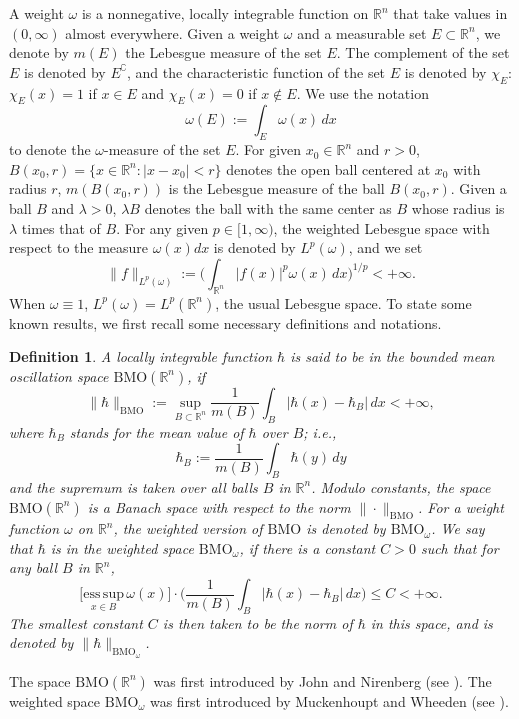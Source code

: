 \documentclass[preprint,10pt]{elsarticle}
\newtheorem{defin}[thm]{Definition}
\numberwithin{equation}{section}
\begin{document}
A weight $\omega$ is a nonnegative, locally integrable function on $\mathbb R^n$ that take values in $(0,\infty)$ almost everywhere. Given a weight $\omega$ and a measurable set $E\subset\mathbb R^n$, we denote by $m(E)$ the Lebesgue measure of the set $E$. The complement of the set $E$ is denoted by $E^{\complement}$, and the characteristic function of the set $E$ is denoted by $\chi_{E}$: $\chi_{E}(x)=1$ if $x\in E$ and $\chi_{E}(x)=0$ if $x\notin E$. We use the notation
\begin{equation*}
\omega(E):=\int_{E}\omega(x)\,dx
\end{equation*}
to denote the $\omega$-measure of the set $E$. For given $x_0\in\mathbb R^n$ and $r>0$, $B(x_0,r)=\{x\in\mathbb R^n:|x-x_0|<r\}$ denotes the open ball centered at $x_0$ with radius $r$, $m(B(x_0,r))$ is the Lebesgue measure of the ball $B(x_0,r)$. Given a ball $B$ and $\lambda>0$, $\lambda B$ denotes the ball with the same center as $B$ whose radius is $\lambda$ times that of $B$. For any given $p\in[1,\infty)$, the weighted Lebesgue space with respect to the measure $\omega(x)dx$ is denoted by $L^p(\omega)$, and we set
\begin{equation*}
\|f\|_{L^p(\omega)}:=\bigg(\int_{\mathbb R^n}|f(x)|^p\omega(x)\,dx\bigg)^{1/p}<+\infty.
\end{equation*}
When $\omega\equiv1$, $L^p(\omega)=L^p(\mathbb R^n)$, the usual Lebesgue space.
To state some known results, we first recall some necessary definitions and notations.
\begin{defin}
A locally integrable function $\hbar$ is said to be in the bounded mean oscillation space $\mathrm{BMO}(\mathbb R^n)$, if
\begin{equation*}
\|\hbar\|_{\mathrm{BMO}}:=\sup_{B\subset\mathbb R^n}\frac{1}{m(B)}\int_B|\hbar(x)-\hbar_B|\,dx<+\infty,
\end{equation*}
where $\hbar_B$ stands for the mean value of $\hbar$ over $B$; i.e.,
\begin{equation*}
\hbar_B:=\frac{1}{m(B)}\int_B \hbar(y)\,dy
\end{equation*}
and the supremum is taken over all balls $B$ in $\mathbb R^n$. Modulo constants, the space $\mathrm{BMO}(\mathbb R^n)$ is a Banach space with respect to the norm $\|\cdot\|_{\mathrm{BMO}}$.
For a weight function $\omega$ on $\mathbb R^n$, the weighted version of $\mathrm{BMO}$ is denoted by $\mathrm{BMO}_{\omega}$. We say that $\hbar$ is in the weighted space $\mathrm{BMO}_{\omega}$, if there is a constant $C>0$ such that for any ball $B$ in $\mathbb R^n$,
\begin{equation*}
\Big[\underset{x\in{B}}{\mathrm{ess\,sup}}\,\omega(x)\Big]\cdot
\bigg(\frac{1}{m(B)}\int_B|\hbar(x)-\hbar_B|\,dx\bigg)\leq C<+\infty.
\end{equation*}
The smallest constant $C$ is then taken to be the norm of $\hbar$ in this space, and is denoted by $\|\hbar\|_{\mathrm{BMO}_\omega}$.
\end{defin}
The space $\mathrm{BMO}(\mathbb R^n)$ was first introduced by John and Nirenberg (see \cite{john}). The weighted space $\mathrm{BMO}_{\omega}$ was first introduced by Muckenhoupt and Wheeden (see \cite{muckenhoupt2}).
\end{document}
